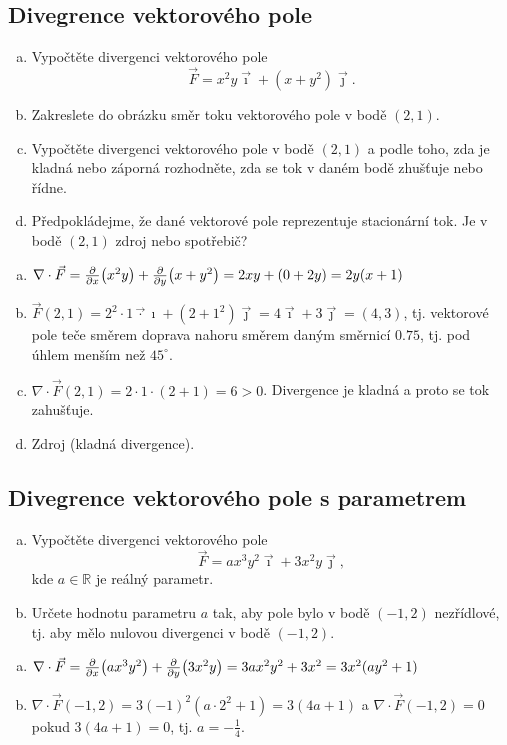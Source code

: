 \subsection{Divegrence vektorového pole}

\begin{enumerate}[a)]
\item Vypočtěte divergenci vektorového pole
  $$\vec F=x^2y\vec \imath + (x+y^2)\vec \jmath.$$
\item Zakreslete do obrázku směr toku vektorového pole v bodě $(2,1)$. 
\item Vypočtěte divergenci vektorového pole v bodě $(2,1)$ a podle toho, zda je kladná nebo záporná rozhodněte, zda se tok v daném bodě zhušťuje nebo řídne.
\item Předpokládejme, že dané vektorové pole reprezentuje stacionární tok. Je v bodě $(2,1)$ zdroj nebo spotřebič?
\end{enumerate}
\reseni

\begin{enumerate}[a)]
\item $\nabla \cdot \vec F=\pdv{x}(x^2y)+\pdv{y}(x+y^2)
=2xy+(0+2y)=2y(x+1)$
\item $\vec F(2,1)=2^2\cdot 1\vec \cdot \imath + (2+1^2)\vec \jmath=4\vec\imath+3\vec\jmath=(4,3)$, tj. vektorové pole teče směrem doprava nahoru směrem daným směrnicí $0.75$, tj. pod úhlem menším než $45^\circ$.
\item $\nabla\cdot\vec F(2,1)=2\cdot 1 \cdot(2+1)=6>0$. Divergence je kladná a proto se tok zahušťuje.
\item Zdroj (kladná divergence).
\end{enumerate}
\konec

\subsection{Divegrence vektorového pole s parametrem}

\begin{enumerate}[a)]
\item Vypočtěte divergenci vektorového pole
  $$\vec F=ax^3y^2\vec \imath + 3x^2y\vec \jmath,$$ kde
  $a\in\mathbb R$ je reálný parametr.
\item Určete hodnotu parametru $a$ tak, aby pole bylo v bodě $(-1,2)$ nezřídlové, tj. aby mělo nulovou divergenci v bodě $(-1,2)$.
\end{enumerate}
\reseni

\begin{enumerate}[a)]
\item $\nabla \cdot \vec F=\pdv{x}(ax^3y^2)+\pdv{y}(3x^2y)
=3ax^2y^2+3x^2=3x^2(ay^2+1)$
\item $\nabla \cdot \vec F (-1,2)=3(-1)^2(a\cdot 2^2+1)=3(4a+1) $ a $\nabla \cdot \vec F (-1,2)=0$ pokud $3(4a+1)=0$, tj. $a=-\frac 14$.
\end{enumerate}
\konec

